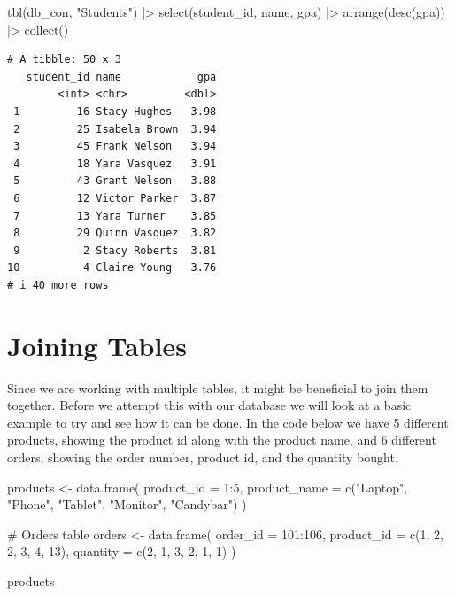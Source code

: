\documentclass[
  letterpaper,
  DIV=11,
  numbers=noendperiod]{scrreprt}
\newenvironment{Shaded}{\begin{snugshade}}{\end{snugshade}}
\newcommand{\AttributeTok}[1]{\textcolor[rgb]{0.40,0.45,0.13}{#1}}
\newcommand{\CommentTok}[1]{\textcolor[rgb]{0.37,0.37,0.37}{#1}}
\newcommand{\DecValTok}[1]{\textcolor[rgb]{0.68,0.00,0.00}{#1}}
\newcommand{\FunctionTok}[1]{\textcolor[rgb]{0.28,0.35,0.67}{#1}}
\newcommand{\NormalTok}[1]{\textcolor[rgb]{0.00,0.23,0.31}{#1}}
\newcommand{\OtherTok}[1]{\textcolor[rgb]{0.00,0.23,0.31}{#1}}
\newcommand{\SpecialCharTok}[1]{\textcolor[rgb]{0.37,0.37,0.37}{#1}}
\newcommand{\StringTok}[1]{\textcolor[rgb]{0.13,0.47,0.30}{#1}}
\begin{document}
\begin{Shaded}
\begin{Highlighting}[]
\FunctionTok{tbl}\NormalTok{(db\_con, }\StringTok{"Students"}\NormalTok{) }\SpecialCharTok{|\textgreater{}} \FunctionTok{select}\NormalTok{(student\_id, name, gpa) }\SpecialCharTok{|\textgreater{}} 
        \FunctionTok{arrange}\NormalTok{(}\FunctionTok{desc}\NormalTok{(gpa)) }\SpecialCharTok{|\textgreater{}} 
        \FunctionTok{collect}\NormalTok{()}
\end{Highlighting}
\end{Shaded}

\begin{verbatim}
# A tibble: 50 x 3
   student_id name            gpa
        <int> <chr>         <dbl>
 1         16 Stacy Hughes   3.98
 2         25 Isabela Brown  3.94
 3         45 Frank Nelson   3.94
 4         18 Yara Vasquez   3.91
 5         43 Grant Nelson   3.88
 6         12 Victor Parker  3.87
 7         13 Yara Turner    3.85
 8         29 Quinn Vasquez  3.82
 9          2 Stacy Roberts  3.81
10          4 Claire Young   3.76
# i 40 more rows
\end{verbatim}

\section{Joining Tables}\label{joining-tables}

Since we are working with multiple tables, it might be beneficial to
join them together. Before we attempt this with our database we will
look at a basic example to try and see how it can be done. In the code
below we have 5 different products, showing the product id along with
the product name, and 6 different orders, showing the order number,
product id, and the quantity bought.

\begin{Shaded}
\begin{Highlighting}[]
\NormalTok{products }\OtherTok{\textless{}{-}} \FunctionTok{data.frame}\NormalTok{(}
  \AttributeTok{product\_id =} \DecValTok{1}\SpecialCharTok{:}\DecValTok{5}\NormalTok{,}
  \AttributeTok{product\_name =} \FunctionTok{c}\NormalTok{(}\StringTok{"Laptop"}\NormalTok{, }\StringTok{"Phone"}\NormalTok{, }\StringTok{"Tablet"}\NormalTok{, }\StringTok{"Monitor"}\NormalTok{, }\StringTok{"Candybar"}\NormalTok{)}
\NormalTok{)}

\CommentTok{\# Orders table}
\NormalTok{orders }\OtherTok{\textless{}{-}} \FunctionTok{data.frame}\NormalTok{(}
  \AttributeTok{order\_id =} \DecValTok{101}\SpecialCharTok{:}\DecValTok{106}\NormalTok{,}
  \AttributeTok{product\_id =} \FunctionTok{c}\NormalTok{(}\DecValTok{1}\NormalTok{, }\DecValTok{2}\NormalTok{, }\DecValTok{2}\NormalTok{, }\DecValTok{3}\NormalTok{, }\DecValTok{4}\NormalTok{, }\DecValTok{13}\NormalTok{),}
  \AttributeTok{quantity =} \FunctionTok{c}\NormalTok{(}\DecValTok{2}\NormalTok{, }\DecValTok{1}\NormalTok{, }\DecValTok{3}\NormalTok{, }\DecValTok{2}\NormalTok{, }\DecValTok{1}\NormalTok{, }\DecValTok{1}\NormalTok{)}
\NormalTok{)}

\NormalTok{products}
\end{Highlighting}
\end{Shaded}
\end{document}
